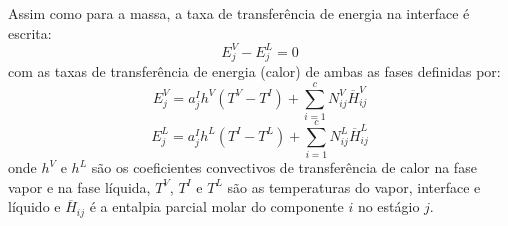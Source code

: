 \begin{enumerate}

Assim como para a massa, a taxa de transferência de energia na interface é escrita:
\begin{equation}
E^V_j -  E^L_j = 0
\label{eq:balancofluxoenergia}
\end{equation}
com as taxas de transferência de energia (calor) de ambas as fases definidas por:
\begin{equation}
E^V_j = a_j^I h^V \left( T^V - T^I\right) + \sum^c_{i=1} N^V_{ij}
\overline{H}^V_{ij}
\label{eq:taxaevj}
\end{equation}
\begin{equation}
E^L_j = a_j^I h^L \left( T^I - T^L\right) + \sum^c_{i=1} N^L_{ij}
\overline{H}^L_{ij}
\label{eq:taxaelj}
\end{equation}
onde $h^V$ e $h^L$ são os coeficientes convectivos de transferência de calor na fase vapor e na fase líquida,
$T^V$, $T^I$ e $T^L$ são as
temperaturas do vapor, interface e líquido e $\overline{H}_{ij}$ é a entalpia parcial molar do componente $i$ no estágio $j$.


\end{enumerate}
